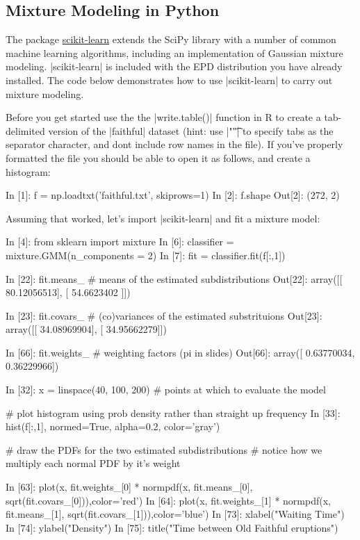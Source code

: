 \subsection{Mixture Modeling in Python}

The package \href{http://scikit-learn.org/stable/}{scikit-learn} extends the SciPy library with a number of common machine learning algorithms, including an implementation of Gaussian mixture modeling.  |scikit-learn| is included with the EPD distribution you have already installed. The code below demonstrates how to use |scikit-learn| to carry out mixture modeling.

Before you get started use the the |write.table()| function in R to create a tab-delimited version of the |faithful| dataset (hint: use |"\t"| to specify tabs as the separator character, and dont include row names in the file). If you've properly formatted the file you should be able to open it as follows, and create a histogram:
%
\begin{python}
In [1]: f = np.loadtxt('faithful.txt', skiprows=1)
In [2]: f.shape
Out[2]: (272, 2)
\end{python}
%
Assuming that worked, let's import |scikit-learn| and fit a mixture model:
%
\begin{python}
In [4]: from sklearn import mixture
In [6]: classifier = mixture.GMM(n_components = 2)
In [7]: fit = classifier.fit(f[:,1])

In [22]: fit.means_  # means of the estimated subdistributions
Out[22]: 
array([[ 80.12056513],
       [ 54.6623402 ]])

In [23]: fit.covars_  # (co)variances of the estimated substrituions
Out[23]: 
array([[ 34.08969904],
       [ 34.95662279]])

In [66]: fit.weights_   #  weighting factors (pi in slides)
Out[66]: array([ 0.63770034,  0.36229966])       

In [32]: x = linspace(40, 100, 200) # points at which to evaluate the model

# plot histogram using prob density rather than straight up frequency
In [33]: hist(f[:,1], normed=True, alpha=0.2, color='gray') 

# draw the PDFs for the two estimated subdistributions
# notice how we multiply each normal PDF by it's weight

In [63]: plot(x, fit.weights_[0] * normpdf(x, fit.means_[0], sqrt(fit.covars_[0])),color='red')
In [64]: plot(x, fit.weights_[1] * normpdf(x, fit.means_[1], sqrt(fit.covars_[1])),color='blue')
In [73]: xlabel("Waiting Time")
In [74]: ylabel("Density")
In [75]: title("Time between Old Faithful eruptions")
\end{python}


